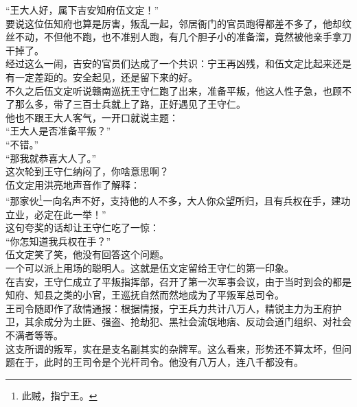 \begin{multicols}{\theparacolNo}
“王大人好，属下吉安知府伍文定！”\\

要说这位伍知府也算是厉害，叛乱一起，邻居衙门的官员跑得都差不多了，他却纹丝不动，不但他不跑，也不准别人跑，有几个胆子小的准备溜，竟然被他亲手拿刀干掉了。\\

经过这么一闹，吉安的官员们达成了一个共识：宁王再凶残，和伍文定比起来还是有一定差距的。安全起见，还是留下来的好。\\

不久之后伍文定听说赣南巡抚王守仁跑了出来，准备平叛，他这人性子急，也顾不了那么多，带了三百士兵就上了路，正好遇见了王守仁。\\

他也不跟王大人客气，一开口就说主题：\\

“王大人是否准备平叛？”\\

“不错。”\\

“那我就恭喜大人了。”\\

这次轮到王守仁纳闷了，你啥意思啊？\\

伍文定用洪亮地声音作了解释：\\

“那家伙\footnote{此贼，指宁王。}一向名声不好，支持他的人不多，大人你众望所归，且有兵权在手，建功立业，必定在此一举！”\\

这句夸奖的话却让王守仁吃了一惊：\\

“你怎知道我兵权在手？”\\

伍文定笑了笑，他没有回答这个问题。\\

一个可以派上用场的聪明人。这就是伍文定留给王守仁的第一印象。\\

在吉安，王守仁成立了平叛指挥部，召开了第一次军事会议，由于当时到会的都是知府、知县之类的小官，王巡抚自然而然地成为了平叛军总司令。\\

王司令随即作了敌情通报：根据情报，宁王兵力共计八万人，精锐主力为王府护卫，其余成分为土匪、强盗、抢劫犯、黑社会流氓地痞、反动会道门组织、对社会不满者等等。\\

这支所谓的叛军，实在是支名副其实的杂牌军。这么看来，形势还不算太坏，但问题在于，此时的王司令是个光杆司令。他没有八万人，连八千都没有。\\


\end{multicols}

